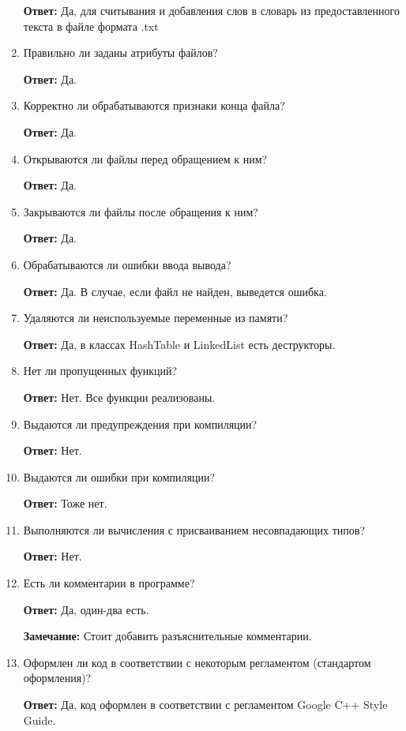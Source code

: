 \documentclass[11pt,a4paper,final]{article} %
\begin{document}
\begin{enumerate}
	\textbf{Ответ:} Да, для считывания и добавления слов в словарь из предоставленного текста в файле формата .txt
	
	\item Правильно ли заданы атрибуты файлов?
	
	\textbf{Ответ:} Да. 
	
	\item Корректно ли обрабатываются признаки конца файла?
	
	\textbf{Ответ:} Да. 
	
	\item Открываются ли файлы перед обращением к ним? 
	
	\textbf{Ответ:} Да. 
	
	\item Закрываются ли файлы после обращения к ним?  
	
	\textbf{Ответ:} Да. 
	
	\item Обрабатываются ли ошибки ввода вывода? 
	
	\textbf{Ответ:} Да. В случае, если файл не найден, выведется ошибка.
	
	\item Удаляются ли неиспользуемые переменные из памяти?
	
	\textbf{Ответ:} Да, в классах HashTable и LinkedList есть деструкторы.
	
	\item Нет ли пропущенных функций?
	
	\textbf{Ответ:} Нет. Все функции реализованы.
	
	\item Выдаются ли предупреждения при компиляции?
	
	\textbf{Ответ:} Нет.
	
	\item Выдаются ли ошибки при компиляции?
	
	\textbf{Ответ:} Тоже нет.
	
	\item Выполняются ли вычисления с присваиванием несовпадающих типов?
	
	\textbf{Ответ:} Нет.
	
	\item Есть ли комментарии в программе?
	
	\textbf{Ответ:} Да, один-два есть.
	
	\textbf{Замечание:} Стоит добавить разъяснительные комментарии.
	
	\item Оформлен ли код в соответствии с некоторым регламентом (стандартом оформления)?
	
	\textbf{Ответ:} Да, код оформлен в соответствии с регламентом Google C++ Style Guide.
	

\end{enumerate}
\end{document}

